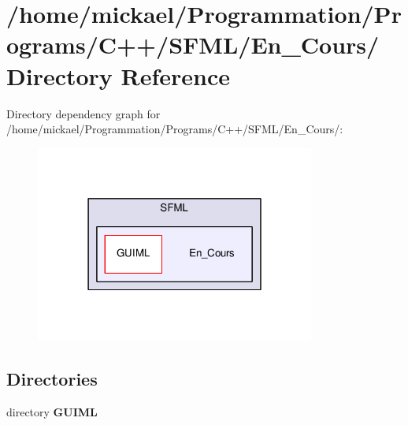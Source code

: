 \section{/home/mickael/\-Programmation/\-Programs/\-C++/\-S\-F\-M\-L/\-En\-\_\-\-Cours/ Directory Reference}
\label{dir_2ab55fb90aec6cda593b74387f62665d}
Directory dependency graph for /home/mickael/\-Programmation/\-Programs/\-C++/\-S\-F\-M\-L/\-En\-\_\-\-Cours/\-:\nopagebreak
\begin{figure}[H]
\begin{center}
\leavevmode
\includegraphics[width=260pt]{dir_2ab55fb90aec6cda593b74387f62665d_dep}
\end{center}
\end{figure}
\subsection*{Directories}
\begin{DoxyCompactItemize}
\item 
directory {\bf G\-U\-I\-M\-L}
\end{DoxyCompactItemize}
